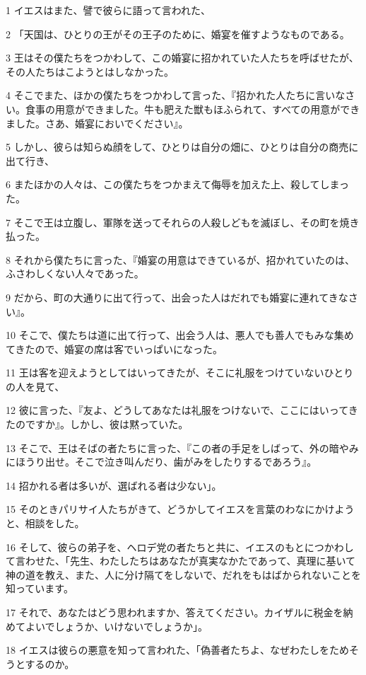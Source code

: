 \par 1 イエスはまた、譬で彼らに語って言われた、
\par 2 「天国は、ひとりの王がその王子のために、婚宴を催すようなものである。
\par 3 王はその僕たちをつかわして、この婚宴に招かれていた人たちを呼ばせたが、その人たちはこようとはしなかった。
\par 4 そこでまた、ほかの僕たちをつかわして言った、『招かれた人たちに言いなさい。食事の用意ができました。牛も肥えた獣もほふられて、すべての用意ができました。さあ、婚宴においでください』。
\par 5 しかし、彼らは知らぬ顔をして、ひとりは自分の畑に、ひとりは自分の商売に出て行き、
\par 6 またほかの人々は、この僕たちをつかまえて侮辱を加えた上、殺してしまった。
\par 7 そこで王は立腹し、軍隊を送ってそれらの人殺しどもを滅ぼし、その町を焼き払った。
\par 8 それから僕たちに言った、『婚宴の用意はできているが、招かれていたのは、ふさわしくない人々であった。
\par 9 だから、町の大通りに出て行って、出会った人はだれでも婚宴に連れてきなさい』。
\par 10 そこで、僕たちは道に出て行って、出会う人は、悪人でも善人でもみな集めてきたので、婚宴の席は客でいっぱいになった。
\par 11 王は客を迎えようとしてはいってきたが、そこに礼服をつけていないひとりの人を見て、
\par 12 彼に言った、『友よ、どうしてあなたは礼服をつけないで、ここにはいってきたのですか』。しかし、彼は黙っていた。
\par 13 そこで、王はそばの者たちに言った、『この者の手足をしばって、外の暗やみにほうり出せ。そこで泣き叫んだり、歯がみをしたりするであろう』。
\par 14 招かれる者は多いが、選ばれる者は少ない」。
\par 15 そのときパリサイ人たちがきて、どうかしてイエスを言葉のわなにかけようと、相談をした。
\par 16 そして、彼らの弟子を、ヘロデ党の者たちと共に、イエスのもとにつかわして言わせた、「先生、わたしたちはあなたが真実なかたであって、真理に基いて神の道を教え、また、人に分け隔てをしないで、だれをもはばかられないことを知っています。
\par 17 それで、あなたはどう思われますか、答えてください。カイザルに税金を納めてよいでしょうか、いけないでしょうか」。
\par 18 イエスは彼らの悪意を知って言われた、「偽善者たちよ、なぜわたしをためそうとするのか。
